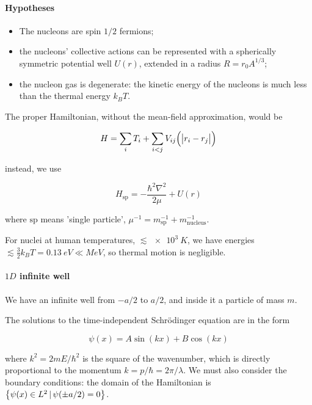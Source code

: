\documentclass[main.tex]{subfiles}
\begin{document}
\paragraph{Hypotheses}

\begin{itemize}
    \item The nucleons are spin \(1/2\) fermions;
    \item the nucleons' collective actions can be represented with a spherically symmetric potential well \(U(r)\), extended in a radius \(R = r_0 A^{1/3}\);
    \item the nucleon gas is degenerate: the kinetic energy of the nucleons is much less than the thermal energy \(k_B T\).
\end{itemize}

The proper Hamiltonian, without the mean-field approximation,  would be

\begin{equation}
    H = \sum _{i} T_i + \sum _{i<j} V_{ij} \qty(\abs{r_i - r_j} )
\end{equation}

instead, we use

\begin{equation}
    H_{\text{sp}} = -\frac{\hbar^2 \nabla^2}{2 \mu} + U(r)
\end{equation}

where \(\text{sp}\) means 'single particle', \(\mu ^{-1} = m _{\text{sp}} ^{-1} + m _{\text{nucleus}} ^{-1}\).

For nuclei at human temperatures, \(\lesssim \SI{e3}{K} \), we have energies \(\lesssim \frac{3}{2} k_B T = \SI{0.13}{eV}  \ll MeV \), so thermal motion is negligible.

\paragraph{\(1D\) infinite well}

We have an infinite well from \(-a/2\) to \(a/2\), and inside it a particle of mass \(m\).

The solutions to the time-independent Schrödinger equation are in the form

\begin{equation}
    \psi(x) = A \sin(kx) +B \cos(kx)
\end{equation}

where \(k^2  = 2mE / \hbar^2\) is the square of the wavenumber, which is directly proportional to the momentum \(k = p/\hbar = 2 \pi / \lambda\). We must also consider the boundary conditions: the domain of the Hamiltonian is \(\qty{\psi(x) \in L^2 \,|\, \psi(\pm a/2)=0 } \).
\end{document}
